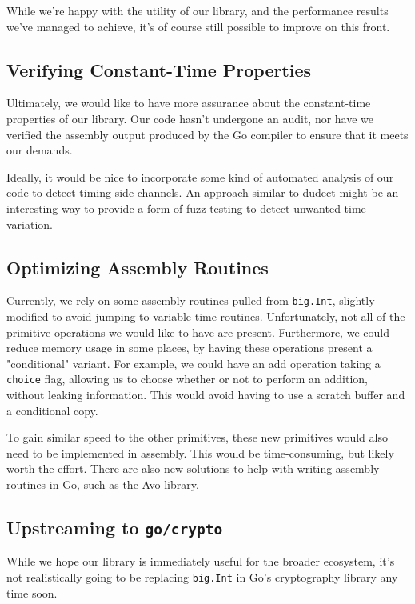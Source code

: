 \documentclass[11pt, a4paper]{article} %
\begin{document}
{While we're happy with the utility of our library,
and the performance results we've managed to achieve, it's
of course still possible to improve on this front.

\subsection{Verifying Constant-Time Properties}

Ultimately, we would like to have more assurance about the
constant-time properties of our library. Our code hasn't
undergone an audit, nor have we verified the assembly output
produced by the Go compiler to ensure that it meets our demands.

Ideally, it would be nice to incorporate some kind of automated
analysis of our code to detect timing side-channels. An approach
similar to dudect
\cite{reparaz_dude_2017} 
might be an interesting way to provide a form of fuzz testing
to detect unwanted time-variation.

\subsection{Optimizing Assembly Routines}

Currently, we rely on some assembly routines pulled from
\texttt{big.Int}, slightly modified to avoid jumping to variable-time
routines. Unfortunately, not all of the primitive operations we would
like to have are present. Furthermore, we could reduce memory usage
in some places, by having these operations present a "conditional"
variant. For example, we could have an add operation taking a
\texttt{choice} flag, allowing us to choose whether or not to perform
an addition, without leaking information. This would avoid having
to use a scratch buffer and a conditional copy.

To gain similar speed to the other primitives, these new primitives
would also need to be implemented in assembly. This would be time-consuming,
but likely worth the effort. There are also new solutions
to help with writing assembly routines in Go, such as the Avo library.

\subsection{Upstreaming to \texttt{go/crypto}}

While we hope our library is immediately useful for the broader
ecosystem, it's not realistically going to be replacing
\texttt{big.Int} in Go's cryptography library any time soon.

}
\end{document}
